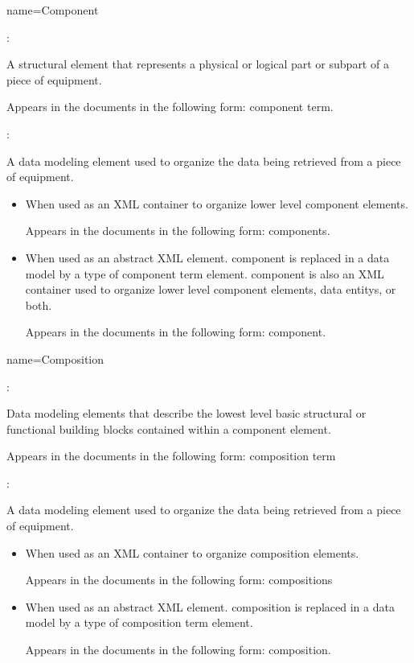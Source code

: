 {
  name={Component}
}
{
  :

  A \gls{structural element} that represents a physical or logical part or subpart of a piece of equipment.

  Appears in the documents in the following form: \gls{component term}.

  :

  A data modeling element used to organize the data being retrieved from a piece of equipment.
  
  \begin{itemize}
      \item When used as an XML container to organize \gls{lower level} \gls{component} elements. 
      
      Appears in the documents in the following form: \gls{components}.
      
      \item When used as an abstract XML element. \gls{component} is replaced in a data model by a type of \gls{component term} element. \gls{component} is also an XML container used to organize \gls{lower level} \gls{component} elements, \glspl{data entity}, or both.
      
      Appears in the documents in the following form: \gls{component}.
  \end{itemize}
}

{
  name={Composition}
}
{
  :

  Data modeling elements that describe the lowest level basic structural or functional building blocks contained within a \gls{component} element.

  Appears in the documents in the following form: \gls{composition term}

  :

  A data modeling element used to organize the data being retrieved from a piece of equipment.

  \begin{itemize}
      \item When used as an XML container to organize \gls{composition} elements. 
      
      Appears in the documents in the following form: \gls{compositions}
      
      \item When used as an abstract XML element. \gls{composition} is replaced in a data model by a type of \gls{composition term} element. 
      
      Appears in the documents in the following form: \gls{composition}.
  \end{itemize}
}


